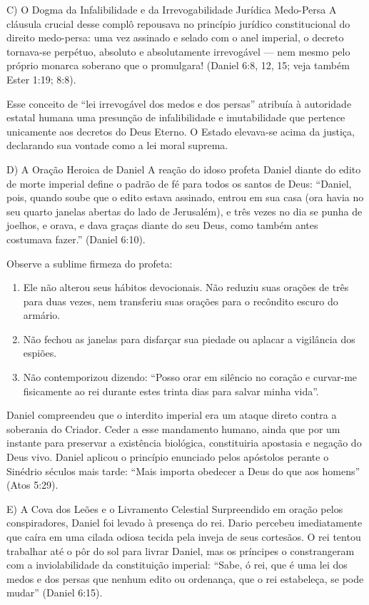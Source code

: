 \documentclass[11pt,a4paper,openany]{book}
\begin{document}
C) O Dogma da Infalibilidade e da Irrevogabilidade Jurídica Medo-Persa
A cláusula crucial desse complô repousava no princípio jurídico constitucional do direito medo-persa: uma vez assinado e selado com o anel imperial, o decreto tornava-se perpétuo, absoluto e absolutamente irrevogável — nem mesmo pelo próprio monarca soberano que o promulgara! (Daniel 6:8, 12, 15; veja também Ester 1:19; 8:8).

Esse conceito de ``lei irrevogável dos medos e dos persas'' atribuía à autoridade estatal humana uma presunção de infalibilidade e imutabilidade que pertence unicamente aos decretos do Deus Eterno. O Estado elevava-se acima da justiça, declarando sua vontade como a lei moral suprema.

D) A Oração Heroica de Daniel
A reação do idoso profeta Daniel diante do edito de morte imperial define o padrão de fé para todos os santos de Deus:
``Daniel, pois, quando soube que o edito estava assinado, entrou em sua casa (ora havia no seu quarto janelas abertas do lado de Jerusalém), e três vezes no dia se punha de joelhos, e orava, e dava graças diante do seu Deus, como também antes costumava fazer.'' (Daniel 6:10).

Observe a sublime firmeza do profeta:
\begin{enumerate}
  \item Ele não alterou seus hábitos devocionais. Não reduziu suas orações de três para duas vezes, nem transferiu suas orações para o recôndito escuro do armário.
  \item Não fechou as janelas para disfarçar sua piedade ou aplacar a vigilância dos espiões.
  \item Não contemporizou dizendo: ``Posso orar em silêncio no coração e curvar-me fisicamente ao rei durante estes trinta dias para salvar minha vida''.
\end{enumerate}

Daniel compreendeu que o interdito imperial era um ataque direto contra a soberania do Criador. Ceder a esse mandamento humano, ainda que por um instante para preservar a existência biológica, constituiria apostasia e negação do Deus vivo. Daniel aplicou o princípio enunciado pelos apóstolos perante o Sinédrio séculos mais tarde: ``Mais importa obedecer a Deus do que aos homens'' (Atos 5:29).

E) A Cova dos Leões e o Livramento Celestial
Surpreendido em oração pelos conspiradores, Daniel foi levado à presença do rei. Dario percebeu imediatamente que caíra em uma cilada odiosa tecida pela inveja de seus cortesãos. O rei tentou trabalhar até o pôr do sol para livrar Daniel, mas os príncipes o constrangeram com a inviolabilidade da constituição imperial: ``Sabe, ó rei, que é uma lei dos medos e dos persas que nenhum edito ou ordenança, que o rei estabeleça, se pode mudar'' (Daniel 6:15).
\end{document}

